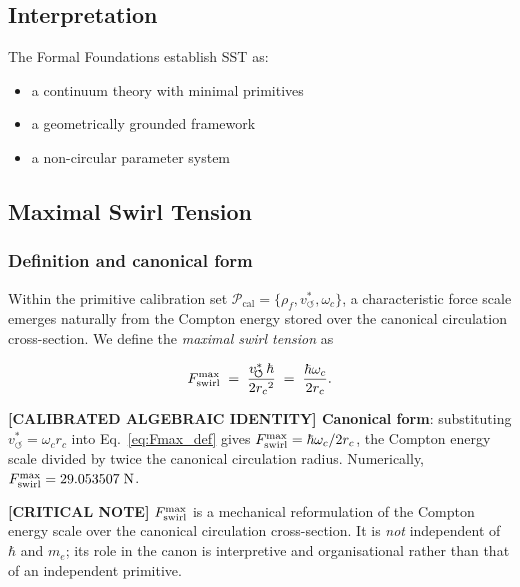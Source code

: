 \documentclass[11pt]{article}
\theoremstyle{definition}
\theoremstyle{plain}
\theoremstyle{remark}
\newcommand{\rhoF}{{\rho_{\!f}}}
\newcommand{\rc}{{r_c}}
\newcommand{\vchar}{v_{\!\boldsymbol{\circlearrowleft}}^{\ast}}
\begin{document}
    \subsection{Interpretation}
        
        The Formal Foundations establish SST as:
        
        \begin{itemize}
            \item a continuum theory with minimal primitives
            \item a geometrically grounded framework
            \item a non-circular parameter system
        \end{itemize}

    \subsection{Maximal Swirl Tension}
    \label{sec:Fmax}

        \subsubsection{Definition and canonical form}

        Within the primitive calibration set $\mathcal{P}_{\mathrm{cal}} = \{\rhoF, \vchar, \omega_c\}$, a characteristic force scale emerges naturally from the Compton energy stored over the canonical circulation cross-section. We define the \emph{maximal swirl tension} as

        \begin{align}
            F_{\rm swirl}^{\max}
            \;=\; \frac{\vchar\,\hbar}{2\rc^2}
            \;=\; \frac{\hbar\omega_c}{2\rc}.
            \label{eq:Fmax_def}
        \end{align}

        \textbf{[CALIBRATED ALGEBRAIC IDENTITY] Canonical form}: substituting $\vchar = \omega_c \rc$ into Eq.~\eqref{eq:Fmax_def} gives $F_{\rm swirl}^{\max} = \hbar\omega_c/2\rc$, the Compton energy scale divided by twice the canonical circulation radius. Numerically, $F_{\rm swirl}^{\max} = 29.053507\;\text{N}$.

        \textbf{[CRITICAL NOTE]} $F_{\rm swirl}^{\max}$ is a mechanical reformulation of the Compton energy scale over the canonical circulation cross-section. It is \emph{not} independent of $\hbar$ and $m_e$; its role in the canon is interpretive and organisational rather than that of an independent primitive.
\end{document}
